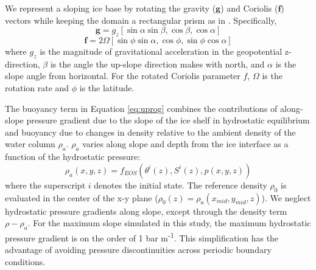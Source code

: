 \documentclass[draft]{agujournal2019}
\begin{document}
We represent a sloping ice base by rotating the gravity ($\textbf{g}$) and Coriolis ($\textbf{f}$) vectors while keeping the domain a rectangular prism as in . 
Specifically, 
\begin{equation} \label{eq:g}
	\textbf{g} = g_z [\sin \alpha \sin \beta,\cos \beta,\cos \alpha]
\end{equation}
\begin{equation} \label{eq:f}
    \textbf{f} = 2 \Omega [\sin \phi \sin \alpha,\cos \phi,\sin \phi \cos \alpha]
\end{equation}
where $g_z$ is the magnitude of gravitational acceleration in the geopotential z-direction, $\beta$ is the angle the up-slope direction makes with north, and $\alpha$ is the slope angle from horizontal. For the rotated Coriolis parameter $f$, $\Omega$ is the rotation rate and $\phi$ is the latitude. 

The buoyancy term in Equation \ref{eq:uprog} combines the contributions of along-slope pressure gradient due to the slope of the ice shelf in hydrostatic equilibrium and buoyancy due to changes in density relative to the ambient density of the water column $\rho_a$. $\rho_a$ varies along slope and depth from the ice interface as a function of the hydrostatic pressure:
\begin{equation}
    \rho_a(x,y,z) = f_{EOS}\left(\theta^i(z),S^i(z),p(x,y,z)\right)
\end{equation}
where the superscript $i$ denotes the initial state. The reference density $\rho_0$ is evaluated in the center of the x-y plane ($\rho_0(z) = \rho_a(x_{mid},y_{mid},z)$). 
%
We neglect hydrostatic pressure gradients along slope, except through the density term $\rho-\rho_a$. For the maximum slope simulated in this study, the maximum hydrostatic pressure gradient is on the order of 1 bar m\textsuperscript{-1}. %
This simplification has the advantage of avoiding pressure discontinuities across periodic boundary conditions. 
\end{document}
